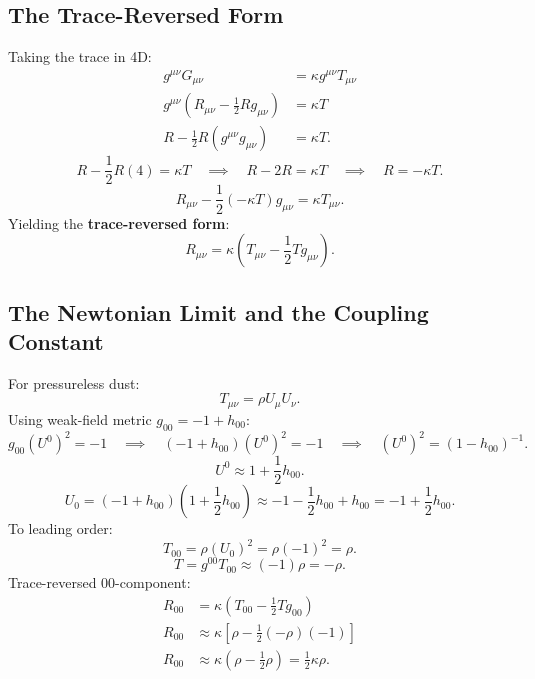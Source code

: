 \documentclass[11pt, a4paper]{report}
\begin{document}
\subsection{The Trace-Reversed Form}
Taking the trace in 4D:
\begin{align}
g^{\mu\nu} G_{\mu\nu} &= \kappa g^{\mu\nu} T_{\mu\nu} \nonumber \\
g^{\mu\nu} \left( R_{\mu\nu} - \frac{1}{2}R g_{\mu\nu} \right) &= \kappa T \nonumber \\
R - \frac{1}{2}R (g^{\mu\nu}g_{\mu\nu}) &= \kappa T.
\end{align}
\begin{equation}
R - \frac{1}{2}R(4) = \kappa T \quad \implies \quad R - 2R = \kappa T \quad \implies \quad R = -\kappa T.
\end{equation}
\begin{equation}
R_{\mu\nu} - \frac{1}{2}(-\kappa T)g_{\mu\nu} = \kappa T_{\mu\nu}.
\end{equation}
Yielding the \textbf{trace-reversed form}:
\begin{equation}
\label{eq:einstein_trace_reversed}
R_{\mu\nu} = \kappa \left( T_{\mu\nu} - \frac{1}{2}T g_{\mu\nu} \right).
\end{equation}

\subsection{The Newtonian Limit and the Coupling Constant}
For pressureless dust:
\begin{equation}
T_{\mu\nu} = \rho U_{\mu}U_{\nu}.
\end{equation}
Using weak-field metric $g_{00} = -1 + h_{00}$:
\begin{equation}
g_{00}(U^{0})^{2} = -1 \quad \implies \quad (-1 + h_{00})(U^{0})^{2} = -1 \quad \implies \quad (U^{0})^{2} = (1 - h_{00})^{-1}.
\end{equation}
\begin{equation}
U^{0} \approx 1 + \frac{1}{2}h_{00}.
\end{equation}
\begin{equation}
U_{0} = (-1 + h_{00})\left(1 + \frac{1}{2}h_{00}\right) \approx -1 - \frac{1}{2}h_{00} + h_{00} = -1 + \frac{1}{2}h_{00}.
\end{equation}
To leading order:
\begin{equation}
T_{00} = \rho (U_{0})^{2} = \rho (-1)^{2} = \rho.
\end{equation}
\begin{equation}
T = g^{00}T_{00} \approx (-1)\rho = -\rho.
\end{equation}
Trace-reversed 00-component:
\begin{align}
R_{00} &= \kappa \left( T_{00} - \frac{1}{2}T g_{00} \right) \nonumber \\
R_{00} &\approx \kappa \left[ \rho - \frac{1}{2}(-\rho)(-1) \right] \nonumber \\
R_{00} &\approx \kappa \left( \rho - \frac{1}{2}\rho \right) = \frac{1}{2}\kappa\rho.
\end{align}
\end{document}
